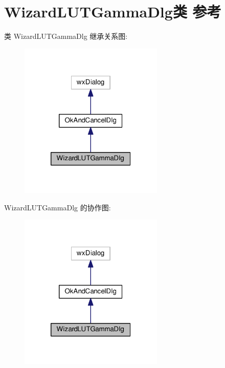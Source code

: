 \hypertarget{class_wizard_l_u_t_gamma_dlg}{\section{Wizard\+L\+U\+T\+Gamma\+Dlg类 参考}
\label{class_wizard_l_u_t_gamma_dlg}
}


类 Wizard\+L\+U\+T\+Gamma\+Dlg 继承关系图\+:
\nopagebreak
\begin{figure}[H]
\begin{center}
\leavevmode
\includegraphics[width=194pt]{class_wizard_l_u_t_gamma_dlg__inherit__graph}
\end{center}
\end{figure}


Wizard\+L\+U\+T\+Gamma\+Dlg 的协作图\+:
\nopagebreak
\begin{figure}[H]
\begin{center}
\leavevmode
\includegraphics[width=194pt]{class_wizard_l_u_t_gamma_dlg__coll__graph}
\end{center}
\end{figure}
